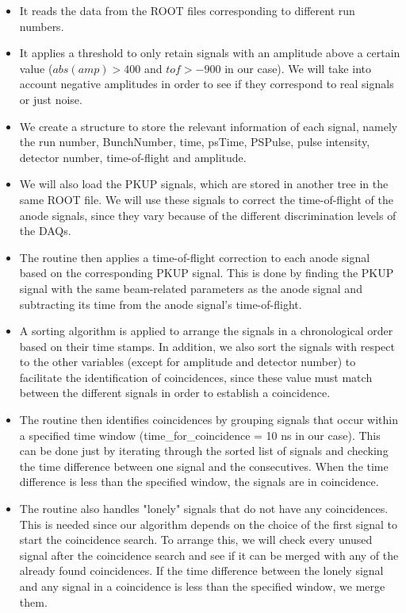 \documentclass{article}
\begin{document}
\begin{itemize}
    \item It reads the data from the ROOT files corresponding to different run numbers.
    \item It applies a threshold to only retain signals with an amplitude above a certain value ($abs(amp)>400$ and $tof>-900$ in our case). We will take into account negative amplitudes in order to see if they correspond to real signals or just noise.
    \item We create a structure to store the relevant information of each signal, namely the run number, BunchNumber, time, psTime, PSPulse, pulse intensity, detector number, time-of-flight and amplitude.
    \item We will also load the PKUP signals, which are stored in another tree in the same ROOT file. We will use these signals to correct the time-of-flight of the anode signals, since they vary because of the different discrimination levels of the DAQs.
    \item The routine then applies a time-of-flight correction to each anode signal based on the corresponding PKUP signal. This is done by finding the PKUP signal with the same beam-related parameters as the anode signal and subtracting its time from the anode signal's time-of-flight.
    \item A sorting algorithm is applied to arrange the signals in a chronological order based on their time stamps. In addition, we also sort the signals with respect to the other variables (except for amplitude and detector number) to facilitate the identification of coincidences, since these value must match between the different signals in order to establish a coincidence.
    \item The routine then identifies coincidences by grouping signals that occur within a specified time window (time\_for\_coincidence = 10 ns in our case). This can be done just by iterating through the sorted list of signals and checking the time difference between one signal and the consecutives. When the time difference is less than the specified window, the signals are in coincidence.
    \item The routine also handles "lonely" signals that do not have any coincidences. This is needed since our algorithm depends on the choice of the first signal to start the coincidence search. To arrange this, we will check every unused signal after the coincidence search and see if it can be merged with any of the already found coincidences. If the time difference between the lonely signal and any signal in a coincidence is less than the specified window, we merge them.

\end{itemize}
\end{document}
